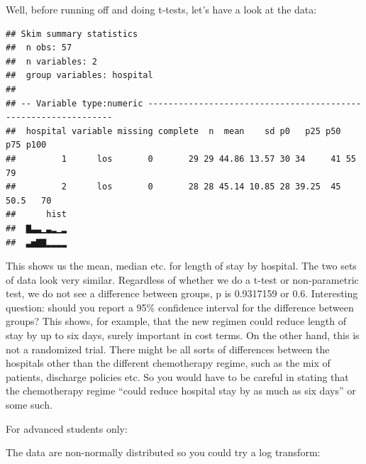\documentclass[]{book}
\newenvironment{Shaded}{\begin{snugshade}}{\end{snugshade}}
\newcommand{\DataTypeTok}[1]{\textcolor[rgb]{0.13,0.29,0.53}{#1}}
\newcommand{\KeywordTok}[1]{\textcolor[rgb]{0.13,0.29,0.53}{\textbf{#1}}}
\newcommand{\NormalTok}[1]{#1}
\newcommand{\OperatorTok}[1]{\textcolor[rgb]{0.81,0.36,0.00}{\textbf{#1}}}
\newcommand{\StringTok}[1]{\textcolor[rgb]{0.31,0.60,0.02}{#1}}
\begin{document}
Well, before running off and doing t-tests, let's have a look at the data:

\begin{Shaded}
\end{Shaded}

\begin{verbatim}
## Skim summary statistics
##  n obs: 57 
##  n variables: 2 
##  group variables: hospital 
## 
## -- Variable type:numeric ---------------------------------------------------------------
##  hospital variable missing complete  n  mean    sd p0   p25 p50  p75 p100
##         1      los       0       29 29 44.86 13.57 30 34     41 55     79
##         2      los       0       28 28 45.14 10.85 28 39.25  45 50.5   70
##      hist
##  ▇▃▃▁▃▂▁▂
##  ▃▅▇▇▂▂▂▂
\end{verbatim}

This shows us the mean, median etc. for length of stay by hospital. The two sets of data look very similar. Regardless of whether we do a t-test or non-parametric test, we do not see a difference between groups, p is 0.9317159 or 0.6. Interesting question: should you report a 95\% confidence interval for the difference between groups? This shows, for example, that the new regimen could reduce length of stay by up to six days, surely important in cost terms. On the other hand, this is not a randomized trial. There might be all sorts of differences between the hospitals other than the different chemotherapy regime, such as the mix of patients, discharge policies etc. So you would have to be careful in stating that the chemotherapy regime ``could reduce hospital stay by as much as six days'' or some such.

For advanced students only:

The data are non-normally distributed so you could try a log transform:

\begin{Shaded}
\end{Shaded}
\end{document}
